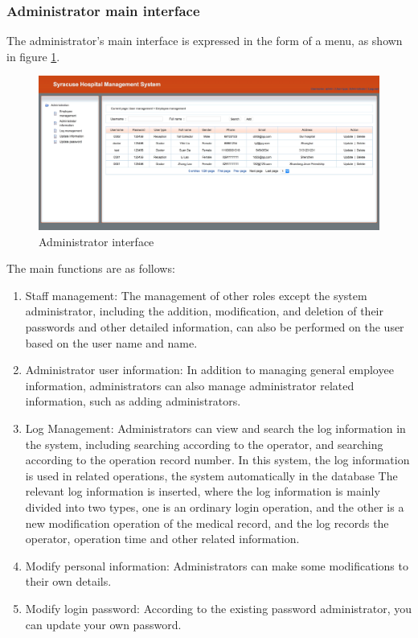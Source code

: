 \subsubsection{Administrator main interface}
\label{sec:admin}
The administrator's main interface is expressed in the form of a menu, as shown in figure \ref{fig:p8}.
\begin{figure}[H]
    \centering
    \includegraphics[width=\textwidth]{8.png}
    \caption{Administrator interface}
    \label{fig:p8}
\end{figure}
The main functions are as follows:
\begin{enumerate}
    \item Staff management: The management of other roles except the system administrator, including the addition, modification, and deletion of their passwords and other detailed information, can also be performed on the user based on the user name and name.
    \item  Administrator user information: In addition to managing general employee information, administrators can also manage administrator related information, such as adding administrators.
    \item Log Management: Administrators can view and search the log information in the system, including searching according to the operator, and searching according to the operation record number. In this system, the log information is used in related operations, the system automatically in the database The relevant log information is inserted, where the log information is mainly divided into two types, one is an ordinary login operation, and the other is a new modification operation of the medical record, and the log records the operator, operation time and other related information.
    \item Modify personal information: Administrators can make some modifications to their own details.
    \item Modify login password: According to the existing password administrator, you can update your own password.
\end{enumerate}
